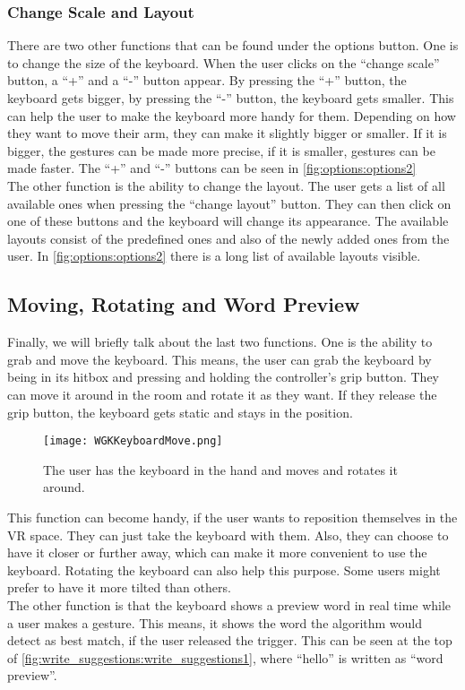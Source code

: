 \subsubsection{Change Scale and Layout}
There are two other functions that can be found under the options button. One is to change the size of the keyboard. When the user clicks on the ``change scale'' button, a ``+'' and a ``-'' button appear. By pressing the ``+'' button, the keyboard gets bigger, by pressing the ``-'' button, the keyboard gets smaller. This can help the user to make the keyboard more handy for them. Depending on how they want to move their arm, they can make it slightly bigger or smaller. If it is bigger, the gestures can be made more precise, if it is smaller, gestures can be made faster. The ``+'' and ``-'' buttons can be seen in \cref{fig:options:options2}\\
The other function is the ability to change the layout. The user gets a list of all available ones when pressing the ``change layout'' button. They can then click on one of these buttons and the keyboard will change its appearance. The available layouts consist of the predefined ones and also of the newly added ones from the user. In \cref{fig:options:options2} there is a long list of available layouts visible.

\subsection{Moving, Rotating and Word Preview}
Finally, we will briefly talk about the last two functions. One is the ability to grab and move the keyboard. This means, the user can grab the keyboard by being in its hitbox and pressing and holding the controller's grip button. They can move it around in the room and rotate it as they want. If they release the grip button, the keyboard gets static and stays in the position.
\begin{figure}[H]
    \centering
    \texttt{[image: WGKKeyboardMove.png]}
    \caption{The user has the keyboard in the hand and moves and rotates it around.}
    \label{fig:move}
\end{figure}
This function can become handy, if the user wants to reposition themselves in the VR space. They can just take the keyboard with them. Also, they can choose to have it closer or further away, which can make it more convenient to use the keyboard. Rotating the keyboard can also help this purpose. Some users might prefer to have it more tilted than others.\\
The other function is that the keyboard shows a preview word in real time while a user makes a gesture. This means, it shows the word the algorithm would detect as best match, if the user released the trigger. This can be seen at the top of \cref{fig:write_suggestions:write_suggestions1}, where ``hello'' is written as ``word preview''.